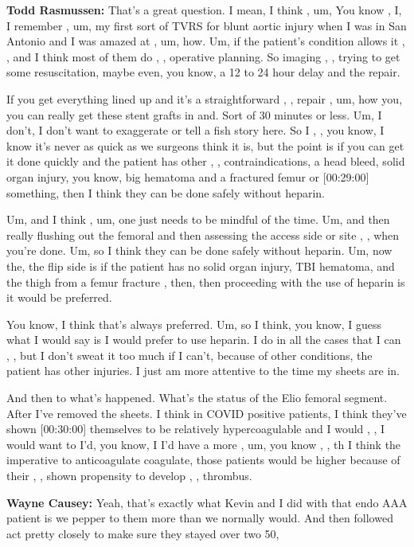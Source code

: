 \documentclass[
]{book}
\begin{document}
\textbf{Todd Rasmussen:} That's a great question. I mean, I think , um, You
know , I, I remember , um, my first sort of TVRS for blunt aortic injury
when I was in San Antonio and I was amazed at , um, how. Um, if the
patient's condition allows it , , and I think most of them do , ,
operative planning. So imaging , , trying to get some resuscitation,
maybe even, you know, a 12 to 24 hour delay and the repair.

If you get everything lined up and it's a straightforward , , repair ,
um, how you, you can really get these stent grafts in and. Sort of 30
minutes or less. Um, I don't, I don't want to exaggerate or tell a fish
story here. So I , , you know, I know it's never as quick as we surgeons
think it is, but the point is if you can get it done quickly and the
patient has other , , contraindications, a head bleed, solid organ
injury, you know, big hematoma and a fractured femur or {[}00:29:00{]}
something, then I think they can be done safely without heparin.

Um, and I think , um, one just needs to be mindful of the time. Um, and
then really flushing out the femoral and then assessing the access side
or site , , when you're done. Um, so I think they can be done safely
without heparin. Um, now the, the flip side is if the patient has no
solid organ injury, TBI hematoma, and the thigh from a femur fracture ,
then, then proceeding with the use of heparin is it would be preferred.

You know, I think that's always preferred. Um, so I think, you know, I
guess what I would say is I would prefer to use heparin. I do in all the
cases that I can , , but I don't sweat it too much if I can't, because
of other conditions, the patient has other injuries. I just am more
attentive to the time my sheets are in.

And then to what's happened. What's the status of the Elio femoral
segment. After I've removed the sheets. I think in COVID positive
patients, I think they've shown {[}00:30:00{]} themselves to be relatively
hypercoagulable and I would , , I would want to I'd, you know, I I'd
have a more , um, you know , , th I think the imperative to
anticoagulate coagulate, those patients would be higher because of their
, , shown propensity to develop , , thrombus.

\textbf{Wayne Causey:} Yeah, that's exactly what Kevin and I did with that
endo AAA patient is we pepper to them more than we normally would. And
then followed act pretty closely to make sure they stayed over two 50,
\end{document}
